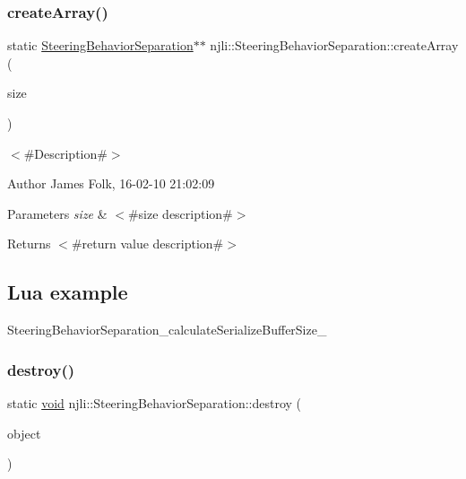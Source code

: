 \subsubsection{\texorpdfstring{create\+Array()}{createArray()}}
{\footnotesize\ttfamily static \mbox{\hyperlink{classnjli_1_1_steering_behavior_separation}{Steering\+Behavior\+Separation}}$\ast$$\ast$ njli\+::\+Steering\+Behavior\+Separation\+::create\+Array (\begin{DoxyParamCaption}\item[{const \mbox{\hyperlink{_util_8h_a10e94b422ef0c20dcdec20d31a1f5049}{u32}}}]{size }\end{DoxyParamCaption})\hspace{0.3cm}{\ttfamily [static]}}



$<$\#\+Description\#$>$ 

\begin{DoxyAuthor}{Author}
James Folk, 16-\/02-\/10 21\+:02\+:09
\end{DoxyAuthor}

\begin{DoxyParams}{Parameters}
{\em size} & $<$\#size description\#$>$\\
\hline
\end{DoxyParams}
\begin{DoxyReturn}{Returns}
$<$\#return value description\#$>$
\end{DoxyReturn}
\hypertarget{classnjli_1_1_steering_behavior_wander_ex1}{}\subsection{Lua example}\label{classnjli_1_1_steering_behavior_wander_ex1}

\begin{DoxyCodeInclude}
\end{DoxyCodeInclude}
Steering\+Behavior\+Separation\+\_\+calculate\+Serialize\+Buffer\+Size\+\_\+ \mbox{\label{classnjli_1_1_steering_behavior_separation_a428498bb04b212eda0dddf634004121d}} 
\subsubsection{\texorpdfstring{destroy()}{destroy()}}
{\footnotesize\ttfamily static \mbox{\hyperlink{_thread_8h_af1e856da2e658414cb2456cb6f7ebc66}{void}} njli\+::\+Steering\+Behavior\+Separation\+::destroy (\begin{DoxyParamCaption}\item[{\mbox{\hyperlink{classnjli_1_1_steering_behavior_separation}{Steering\+Behavior\+Separation}} $\ast$}]{object }\end{DoxyParamCaption})\hspace{0.3cm}{\ttfamily [static]}}



